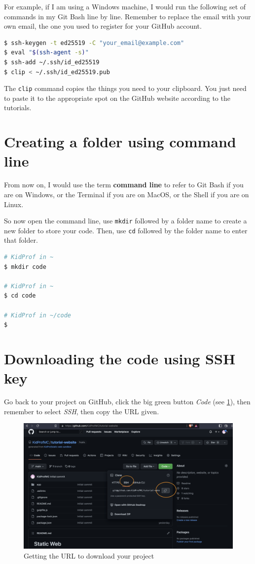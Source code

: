 For example, if I am using a Windows machine, I would run the following set of commands in my Git Bash line by line. Remember to replace the email with your own email, the one you used to register for your GitHub account.

\begin{lstlisting}[language=bash]
$ ssh-keygen -t ed25519 -C "your_email@example.com"
$ eval "$(ssh-agent -s)"
$ ssh-add ~/.ssh/id_ed25519
$ clip < ~/.ssh/id_ed25519.pub
\end{lstlisting}

The \texttt{clip} command copies the things you need to your clipboard. You just need to paste it to the appropriate spot on the GitHub website according to the tutorials.

\section{Creating a folder using command line}
\label{sec:install5}

From now on, I would use the term \textbf{command line} to refer to Git Bash if you are on Windows, or the Terminal if you are on MacOS, or the Shell if you are on Linux. 

So now open the command line, use \texttt{mkdir} followed by a folder name to create a new folder to store your code. Then, use \texttt{cd} followed by the folder name to enter that folder.

\begin{lstlisting}[language=bash]
# KidProf in ~
$ mkdir code

# KidProf in ~
$ cd code

# KidProf in ~/code
$ 
\end{lstlisting}

\section{Downloading the code using SSH key}

Go back to your project on GitHub, click the big green button \textit{Code} (see \cref{fig:downloadbyssh}), then remember to select \textit{SSH}, then copy the URL given.

\begin{figure}[h]
\centering
\includegraphics[width=15cm]{images/ch1-git-clone.png}
\caption{Getting the URL to download your project}
\label{fig:downloadbyssh}
\end{figure}

